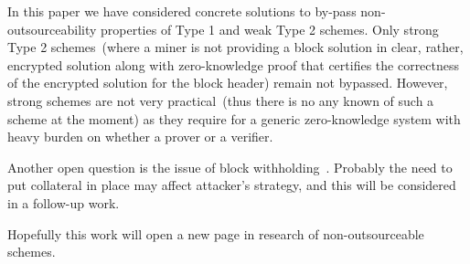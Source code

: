 \documentclass[11pt]{article}
\begin{document}
In this paper we have considered concrete solutions to by-pass non-outsourceability properties of Type 1 and weak Type 2
schemes. Only strong Type 2 schemes~(where a miner is not providing a block solution in clear, rather, encrypted solution
along with zero-knowledge proof that certifies the correctness of the encrypted solution for the block header) remain
not bypassed. However, strong schemes are not very practical~(thus there is no any known of such a scheme at the
moment) as they require for a generic zero-knowledge system with heavy burden on whether a prover or a verifier.

Another open question is the issue of block withholding~\cite{courtois2014subversive}. Probably the need to put
collateral in place may affect attacker's strategy, and this will be considered in a follow-up work.

Hopefully this work will open a new page in research of non-outsourceable schemes.



\appendix
\end{document}
